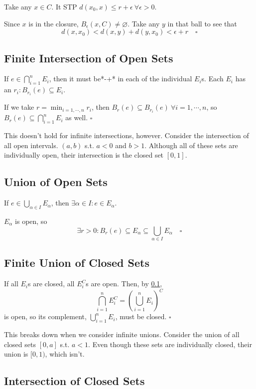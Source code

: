 \documentclass[12pt]{article}
\begin{document}
Take any $x \in C$.
It STP $d(x_0, x) \le r+\epsilon\ \forall \epsilon > 0$.

Since $x$ is in the closure, $B_\epsilon(x, C) \ne \varnothing$.
Take any $y$ in that ball to see that
\[d(x, x_0) < d(x, y) + d(y, x_0) < \epsilon + r\quad\square\]

\subsection{Finite Intersection of Open Sets}\label{sec:open_inter}

If $e \in \bigcap_{i=1}^{n} E_i$, then it must be*-+* in each of the individual $E_i$s.
Each $E_i$ has an $r_i: B_{r_i}(e) \subseteq E_i$.

If we take $r=\min_{i=1, \cdots, n} r_i$, then $B_r(e) \subseteq B_{r_i}(e)\ \forall i=1, \cdots, n$,
so $B_r(e) \subseteq \bigcap_{i=1}^{n} E_i$ as well. $\square$

This doesn't hold for infinite intersections, however.
Consider the intersection of all open intervals. $(a, b)$ s.t. $a < 0$ and $b > 1$.
Although all of these sets are individually open, their intersection is the closed set $[0, 1]$.

\subsection{Union of Open Sets}

If $e \in \bigcup_{\alpha \in I} E_\alpha$, then $\exists \alpha \in I: e \in E_\alpha$.

$E_\alpha$ is open, so
\[\exists r > 0: B_r(e) \subseteq E_\alpha \subseteq \bigcup_{\alpha \in I} E_\alpha\quad\square\]

\subsection{Finite Union of Closed Sets}

If all $E_i$s are closed, all $E_i^C$s are open.
Then, by \ref{sec:open_inter},
\[\bigcap_{i=1}^{n} E_i^C=\left(\bigcup_{i=1}^{n} E_i\right)^C\]
is open, so its complement, $\bigcup_{i=1}^{n} E_i$, must be closed. $\square$

This breaks down when we consider infinite unions.
Consider the union of all closed sets $[0, a]$ s.t. $a < 1$.
Even though these sets are individually closed, their union is $[0, 1)$, which isn't.

\subsection{Intersection of Closed Sets}
\end{document}
